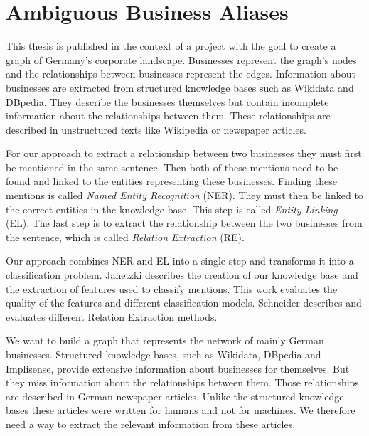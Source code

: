 \section{Ambiguous Business Aliases}
\label{sec:introduction}

This thesis is published in the context of a project with the goal to create a graph of Germany's corporate landscape. Businesses represent the graph's nodes and the relationships between businesses represent the edges. Information about businesses are extracted from structured knowledge bases such as Wikidata and DBpedia. They describe the businesses themselves but contain incomplete information about the relationships between them. These relationships are described in unstructured texts like Wikipedia or newspaper articles.\par
For our approach to extract a relationship between two businesses they must first be mentioned in the same sentence. Then both of these mentions need to be found and linked to the entities representing these businesses. Finding these mentions is called \textit{Named Entity Recognition} (NER). They must then be linked to the correct entities in the knowledge base. This step is called \textit{Entity Linking} (EL). The last step is to extract the relationship between the two businesses from the sentence, which is called \textit{Relation Extraction} (RE).\par
Our approach combines NER and EL into a single step and transforms it into a classification problem. Janetzki describes the creation of our knowledge base and the extraction of features used to classify mentions. This work evaluates the quality of the features and different classification models. Schneider \cite{schneider} describes and evaluates different Relation Extraction methods.\par

\iffalse
We want to build a graph that represents the network of mainly German businesses. Structured knowledge bases, such as Wikidata, DBpedia and Implisense, provide extensive information about businesses for themselves. But they miss information about the relationships between them. Those relationships are described in German newspaper articles. Unlike the structured knowledge bases these articles were written for humans and not for machines. We therefore need a way to extract the relevant information from these articles.

